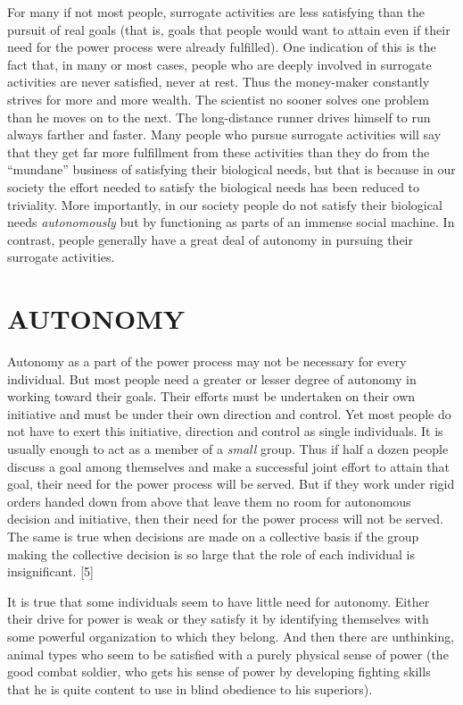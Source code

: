  For many if not most people, surrogate activities are less satisfying than the pursuit of real goals (that is, goals that people would want to attain even if their need for the power process were already fulfilled). One indication of this is the fact that, in many or most cases, people who are deeply involved in surrogate activities are never satisfied, never at rest. Thus the money-maker constantly strives for more and more wealth. The scientist no sooner solves one problem than he moves on to the next. The long-distance runner drives himself to run always farther and faster. Many people who pursue surrogate activities will say that they get far more fulfillment from these activities than they do from the “mundane” business of satisfying their biological needs, but that is because in our society the effort needed to satisfy the biological needs has been reduced to triviality. More importantly, in our society people do not satisfy their biological needs {\em autonomously} but by functioning as parts of an immense social machine. In contrast, people generally have a great deal of autonomy in pursuing their surrogate activities.

\chapter{AUTONOMY}

 Autonomy as a part of the power process may not be necessary for every individual. But most people need a greater or lesser degree of autonomy in working toward their goals. Their efforts must be undertaken on their own initiative and must be under their own direction and control. Yet most people do not have to exert this initiative, direction and control as single individuals. It is usually enough to act as a member of a {\em small} group. Thus if half a dozen people discuss a goal among themselves and make a successful joint effort to attain that goal, their need for the power process will be served. But if they work under rigid orders handed down from above that leave them no room for autonomous decision and initiative, then their need for the power process will not be served. The same is true when decisions are made on a collective basis if the group making the collective decision is so large that the role of each individual is insignificant. [5]

 It is true that some individuals seem to have little need for autonomy. Either their drive for power is weak or they satisfy it by identifying themselves with some powerful organization to which they belong. And then there are unthinking, animal types who seem to be satisfied with a purely physical sense of power (the good combat soldier, who gets his sense of power by developing fighting skills that he is quite content to use in blind obedience to his superiors).

